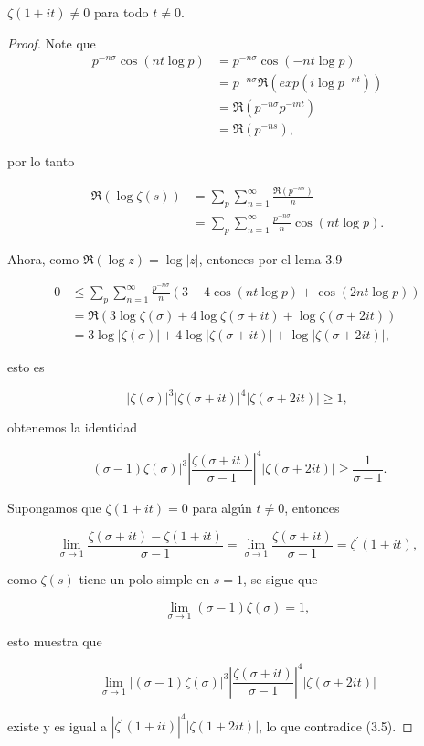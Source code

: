 \begin{theorem}
$\zeta(1+it)\neq 0$ para todo $t\neq 0$.
\end{theorem}

\begin{proof}
Note que
    \begin{align*}
        p^{-n\sigma}\cos(nt\log p)&=p^{-n\sigma}\cos(-nt\log p)\\
        &=p^{-n\sigma}\Re(exp(i\log p^{-nt}))\\
        &=\Re(p^{-n\sigma}p^{-int})\\
        &=\Re(p^{-ns})
    ,\end{align*}

por lo tanto

\begin{align*}
    \Re(\log\zeta(s))&=\sum_{p}\sum_{n=1}^{\infty} \frac{\Re(p^{-ns})}{n}\\
    &=\sum_{p}\sum_{n=1}^{\infty} \frac{p^{-n\sigma}}{n}\cos(nt\log p)
.\end{align*}

Ahora, como $\Re(\log z)=\log|z|$, entonces por el lema 3.9

\begin{align*}
    0&\leq \sum_p \sum_{n=1}^{\infty}\frac{p^{-n \sigma}}{n}(3+4 \cos (n t \log p)+\cos (2 n t \log p))\\
     &=\Re(3\log\zeta(\sigma)+4\log\zeta(\sigma+it)+\log\zeta(\sigma+2it))\\
    &=3 \log |\zeta(\sigma)|+4 \log |\zeta(\sigma+i t)|+\log |\zeta(\sigma+2 i t)|
,\end{align*}

esto es

$$
|\zeta(\sigma)|^3|\zeta(\sigma+i t)|^4|\zeta(\sigma+2 i t)| \geqslant 1,
$$

obtenemos la identidad

\begin{equation}
    |(\sigma-1) \zeta(\sigma)|^3\left|\frac{\zeta(\sigma+i t)}{\sigma-1}\right|^4|\zeta(\sigma+2 i t)| \geqslant \frac{1}{\sigma-1} .
\end{equation}

Supongamos que $\zeta(1+it)=0$ para algún $t\neq 0$, entonces

$$\lim_{\sigma \to 1}\frac{\zeta(\sigma+it)-\zeta(1+it)}{\sigma-1}=\lim_{\sigma \to 1}\frac{\zeta(\sigma+it)}{\sigma-1}=\zeta^{\prime}(1+it),$$

como $\zeta(s)$ tiene un polo simple en $s=1$, se sigue que

$$\lim_{\sigma \to 1} (\sigma-1)\zeta(\sigma)=1,$$

esto muestra que 

$$\lim _{\sigma \rightarrow 1}|(\sigma-1) \zeta(\sigma)|^3\left|\frac{\zeta(\sigma+i t)}{\sigma-1}\right|^4|\zeta(\sigma+2 i t)|$$

existe y es igual a $\left|\zeta^{\prime}(1+i t)\right|^4|\zeta(1+2 i t)|$, lo que contradice (3.5).
\end{proof}

\begin{corollary}

\end{corollary}